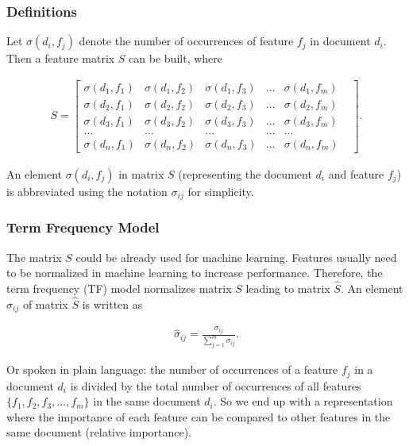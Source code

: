 \documentclass[a4paper,12pt,nottoc]{article}
\begin{document}
\subsubsection{Definitions}

Let $\sigma(d_i, f_j)$ denote the number of occurrences of feature $f_j$ in document $d_i$. Then a feature matrix $S$ can be built, where

\begin{gather}
S =
\begin{bmatrix}
\sigma(d_1, f_1) & \sigma(d_1, f_2) & \sigma(d_1, f_3) & ... & \sigma(d_1, f_m) \\
\sigma(d_2, f_1) & \sigma(d_2, f_2) & \sigma(d_2, f_3) & ... & \sigma(d_2, f_m) \\
\sigma(d_3, f_1) & \sigma(d_3, f_2) & \sigma(d_3, f_3) & ... & \sigma(d_3, f_m) \\
... & ... & ... & ... & ... & \\
 \sigma(d_n, f_1) & \sigma(d_n, f_2) & \sigma(d_n, f_3) & ... & \sigma(d_n, f_m)
\end{bmatrix}.
\end{gather}

\noindent An element $\sigma(d_i, f_j)$ in matrix $S$ (representing the document $d_i$ and feature $f_j$) is abbreviated using the notation $\sigma_{ij}$ for simplicity.

\subsubsection{Term Frequency Model}

The matrix $S$ could be already used for machine learning. Features usually need to be normalized in machine learning to increase performance. Therefore, the term frequency (TF) model normalizes matrix $S$ leading to matrix $\hat{S}$. An element $\hat{\sigma}_{ij}$ of matrix $\hat{S}$ is written as

\begin{gather}\label{eq:tf}
\hat{\sigma}_{ij} = \frac{\sigma_{ij}}{\sum_{j=1}^{m}\sigma_{ij}}.
\end{gather}

\noindent Or spoken in plain language: the number of occurrences of a feature $f_j$ in a document $d_i$ is divided by the total number of occurrences of all features $\{f_1, f_2, f_3, ..., f_m\}$ in the same document $d_i$. So we end up with a representation where the importance of each feature can be compared to other features in the same document (relative importance).
\end{document}
